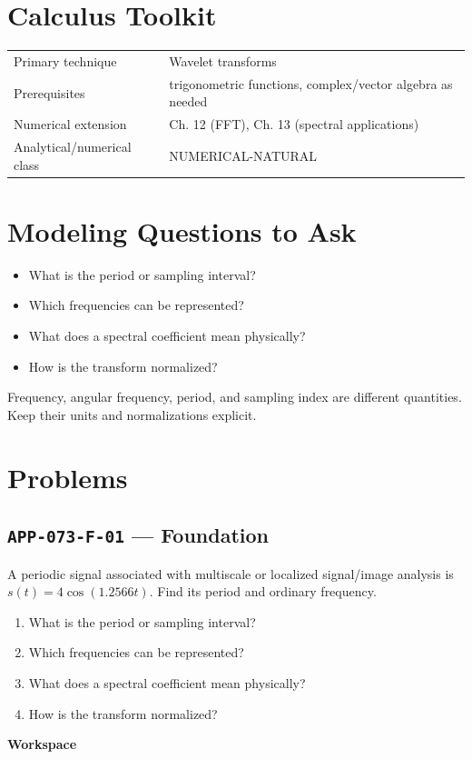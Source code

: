 \documentclass[11pt]{book}
\newcommand{\pid}[1]{\texttt{#1}}
\newcommand{\workspace}{\par\vspace{0.7in}\hrulefill\par\vspace{0.55in}\hrulefill\par}
\begin{document}
\section*{Calculus Toolkit}
\begin{tabularx}{\textwidth}{@{}lX@{}}\toprule
Primary technique & Wavelet transforms \\
Prerequisites & trigonometric functions, complex/vector algebra as needed \\
Numerical extension & Ch. 12 (FFT), Ch. 13 (spectral applications) \\
Analytical/numerical class & NUMERICAL-NATURAL \\
\bottomrule\end{tabularx}
\section*{Modeling Questions to Ask}\begin{itemize}
\item What is the period or sampling interval?
\item Which frequencies can be represented?
\item What does a spectral coefficient mean physically?
\item How is the transform normalized?
\end{itemize}
\begin{errorbox}Frequency, angular frequency, period, and sampling index are different quantities. Keep their units and normalizations explicit.\end{errorbox}
\section*{Problems}
\subsection*{\pid{APP-073-F-01} — Foundation}
\begin{problembox}
A periodic signal associated with multiscale or localized signal/image analysis is $s(t)=4\cos(1.2566t)$. Find its period and ordinary frequency.
\end{problembox}
\begin{promptbox}\begin{enumerate}
\item What is the period or sampling interval?
\item Which frequencies can be represented?
\item What does a spectral coefficient mean physically?
\item How is the transform normalized?
\end{enumerate}\end{promptbox}
\textbf{Workspace}\workspace
{}
\end{document}
